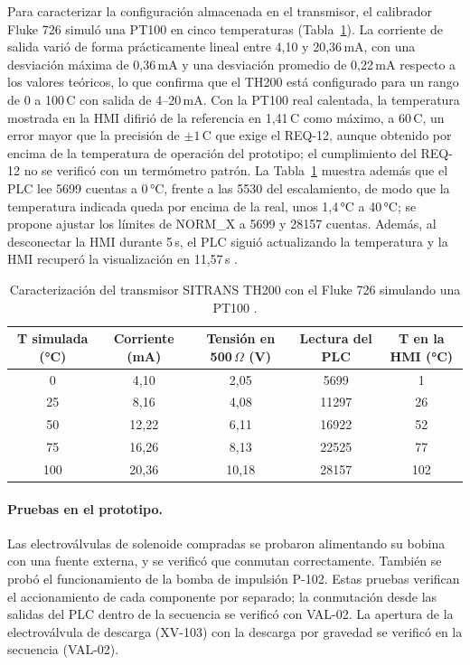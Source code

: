 Para caracterizar la configuración almacenada en el transmisor, el calibrador Fluke 726 simuló una PT100 en cinco temperaturas (Tabla~\ref{tab:caracterizacion_th200}). La corriente de salida varió de forma prácticamente lineal entre 4,10 y 20,36\,mA, con una desviación máxima de 0,36\,mA y una desviación promedio de 0,22\,mA respecto a los valores teóricos, lo que confirma que el TH200 está configurado para un rango de 0 a 100\,\textdegree C con salida de 4--20\,mA. Con la PT100 real calentada, la temperatura mostrada en la HMI difirió de la referencia en 1,41\,\textdegree C como máximo, a 60\,\textdegree C, un error mayor que la precisión de $\pm 1$\,\textdegree C que exige el REQ-12, aunque obtenido por encima de la temperatura de operación del prototipo; el cumplimiento del REQ-12 no se verificó con un termómetro patrón. La Tabla~\ref{tab:caracterizacion_th200} muestra además que el PLC lee 5699 cuentas a 0\,°C, frente a las 5530 del escalamiento, de modo que la temperatura indicada queda por encima de la real, unos 1,4\,°C a 40\,°C; se propone ajustar los límites de NORM\_X a 5699 y 28157 cuentas. Además, al desconectar la HMI durante 5\,s, el PLC siguió actualizando la temperatura y la HMI recuperó la visualización en 11,57\,s \cite{ruiz2026lab4}.

\begin{table}[H]
\centering
\small
\caption{Caracterización del transmisor SITRANS TH200 con el Fluke 726 simulando una PT100 \cite{ruiz2026lab4}.}
\label{tab:caracterizacion_th200}
\begin{tabular}{ccccc}
\toprule
\textbf{T simulada (°C)} & \textbf{Corriente (mA)} & \textbf{Tensión en 500\,$\Omega$ (V)} & \textbf{Lectura del PLC} & \textbf{T en la HMI (°C)}\\
\midrule
0 & 4,10 & 2,05 & 5699 & 1\\
25 & 8,16 & 4,08 & 11297 & 26\\
50 & 12,22 & 6,11 & 16922 & 52\\
75 & 16,26 & 8,13 & 22525 & 77\\
100 & 20,36 & 10,18 & 28157 & 102\\
\bottomrule
\end{tabular}
\end{table}

\paragraph{Pruebas en el prototipo.} Las electroválvulas de solenoide compradas se probaron alimentando su bobina con una fuente externa, y se verificó que conmutan correctamente. También se probó el funcionamiento de la bomba de impulsión P-102. Estas pruebas verifican el accionamiento de cada componente por separado; la conmutación desde las salidas del PLC dentro de la secuencia se verificó con VAL-02. La apertura de la electroválvula de descarga (XV-103) con la descarga por gravedad se verificó en la secuencia (VAL-02).

